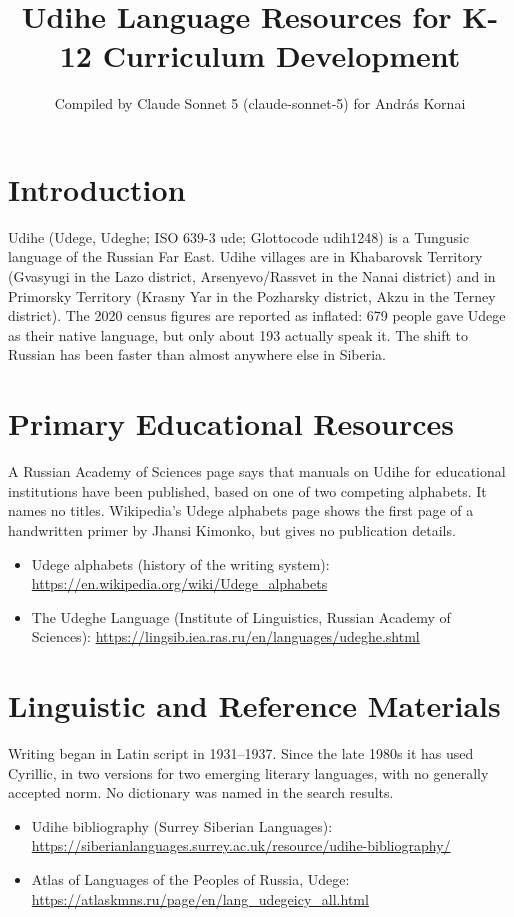 \documentclass[12pt]{article}
\title{Udihe Language Resources for K-12 Curriculum Development}
\author{Compiled by Claude Sonnet 5 (claude-sonnet-5) for Andr\'as Kornai}
\date{}
\begin{document}
\maketitle

\section{Introduction}
Udihe (Udege, Udeghe; ISO 639-3 ude; Glottocode udih1248) is a Tungusic language of the Russian Far East. Udihe villages are in Khabarovsk Territory (Gvasyugi in the Lazo district, Arsenyevo/Rassvet in the Nanai district) and in Primorsky Territory (Krasny Yar in the Pozharsky district, Akzu in the Terney district). The 2020 census figures are reported as inflated: 679 people gave Udege as their native language, but only about 193 actually speak it. The shift to Russian has been faster than almost anywhere else in Siberia.

\section{Primary Educational Resources}
A Russian Academy of Sciences page says that manuals on Udihe for educational institutions have been published, based on one of two competing alphabets. It names no titles. Wikipedia's Udege alphabets page shows the first page of a handwritten primer by Jhansi Kimonko, but gives no publication details.
\begin{itemize}
\item Udege alphabets (history of the writing system): \url{https://en.wikipedia.org/wiki/Udege_alphabets}
\item The Udeghe Language (Institute of Linguistics, Russian Academy of Sciences): \url{https://lingsib.iea.ras.ru/en/languages/udeghe.shtml}
\end{itemize}

\section{Linguistic and Reference Materials}
Writing began in Latin script in 1931--1937. Since the late 1980s it has used Cyrillic, in two versions for two emerging literary languages, with no generally accepted norm. No dictionary was named in the search results.
\begin{itemize}
\item Udihe bibliography (Surrey Siberian Languages): \url{https://siberianlanguages.surrey.ac.uk/resource/udihe-bibliography/}
\item Atlas of Languages of the Peoples of Russia, Udege: \url{https://atlaskmns.ru/page/en/lang_udegeicy_all.html}
\end{itemize}
\end{document}
